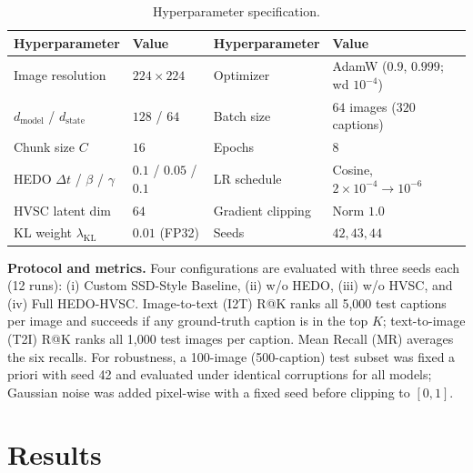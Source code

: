 \documentclass[pdflatex,sn-mathphys-num]{sn-jnl}
\begin{document}
\begin{table}[t]
\centering
\caption{Hyperparameter specification.}
\label{tab:hyperparameters}
\scriptsize
\setlength{\tabcolsep}{4pt}
\begin{tabular}{@{}ll|ll@{}}
\toprule
\textbf{Hyperparameter} & \textbf{Value} & \textbf{Hyperparameter} & \textbf{Value} \\
\midrule
Image resolution & $224 \times 224$ & Optimizer & AdamW ($0.9$, $0.999$; wd $10^{-4}$) \\
$d_{\text{model}}$ / $d_{\text{state}}$ & $128$ / $64$ & Batch size & $64$ images ($320$ captions) \\
Chunk size $C$ & $16$ & Epochs & $8$ \\
HEDO $\Delta t$ / $\beta$ / $\gamma$ & $0.1$ / $0.05$ / $0.1$ & LR schedule & Cosine, $2 \times 10^{-4} \to 10^{-6}$ \\
HVSC latent dim & $64$ & Gradient clipping & Norm $1.0$ \\
KL weight $\lambda_{\text{KL}}$ & $0.01$ (FP32) & Seeds & $42, 43, 44$ \\
\bottomrule
\end{tabular}
\end{table}

\textbf{Protocol and metrics.} Four configurations are evaluated with three seeds each (12 runs): (i) Custom SSD-Style Baseline, (ii) w/o HEDO, (iii) w/o HVSC, and (iv) Full HEDO-HVSC. Image-to-text (I2T) R@K ranks all 5,000 test captions per image and succeeds if any ground-truth caption is in the top $K$; text-to-image (T2I) R@K ranks all 1,000 test images per caption. Mean Recall (MR) averages the six recalls. For robustness, a 100-image (500-caption) test subset was fixed a priori with seed 42 and evaluated under identical corruptions for all models; Gaussian noise was added pixel-wise with a fixed seed before clipping to $[0, 1]$.

\section{Results}
\label{sec:results}
\end{document}
